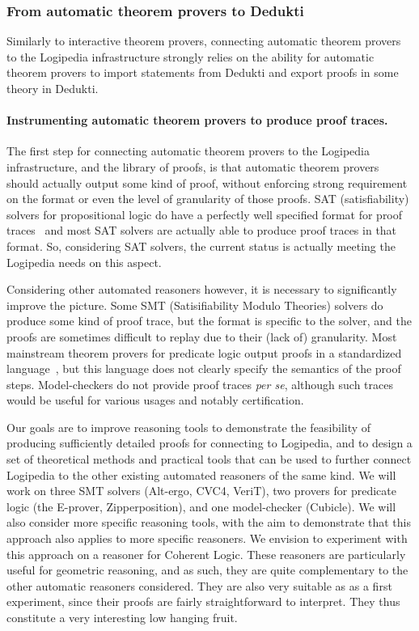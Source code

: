 \subsubsection*{From automatic theorem provers to Dedukti}

Similarly to interactive theorem provers, connecting automatic theorem
provers to the Logipedia infrastructure strongly relies on the ability
for automatic theorem provers to import statements from Dedukti and
export proofs in some theory in Dedukti.


\paragraph*{Instrumenting automatic theorem provers to produce proof traces.}
The first step for connecting automatic theorem provers to the
Logipedia infrastructure, and the library of proofs, is that automatic
theorem provers should actually output some kind of proof, without
enforcing strong requirement on the format or even the level of
granularity of those proofs.  SAT (satisfiability) solvers for
propositional logic do have a perfectly well specified format for
proof traces~\cite{TODO} and most SAT solvers are actually able to
produce proof traces in that format.  So, considering SAT solvers, the
current status is actually meeting the Logipedia needs on this aspect.

Considering other automated reasoners however, it is necessary to
significantly improve the picture.  Some SMT (Satisifiability Modulo
Theories) solvers do produce some kind of proof trace, but the format
is specific to the solver, and the proofs are sometimes difficult to
replay due to their (lack of) granularity.  Most mainstream theorem provers for
predicate logic output proofs in a standardized language~\cite{TODO},
but this language does not clearly specify the semantics of the proof
steps.  Model-checkers do not provide proof traces {\em per se}, although
such traces would be useful for various usages and notably
certification.

Our goals are to improve reasoning tools to demonstrate the
feasibility of producing sufficiently detailed proofs for connecting to
Logipedia, and to design a set of theoretical methods and practical
tools that can be used to further connect Logipedia to the other
existing automated reasoners of the same kind.  We will work on three
SMT solvers (Alt-ergo, CVC4, VeriT), two provers for predicate logic
(the E-prover, Zipperposition), and one model-checker (Cubicle).  We
will also consider more specific reasoning tools, with the aim to
demonstrate that this approach also applies to more specific
reasoners.  We envision to experiment with this approach on a reasoner
for Coherent Logic.  These reasoners are particularly useful for geometric
reasoning, and as such, they are quite complementary to the other
automatic reasoners considered.  They are also very suitable as as a
first experiment, since their proofs are fairly straightforward to
interpret.  They thus constitute a very interesting low hanging fruit.

